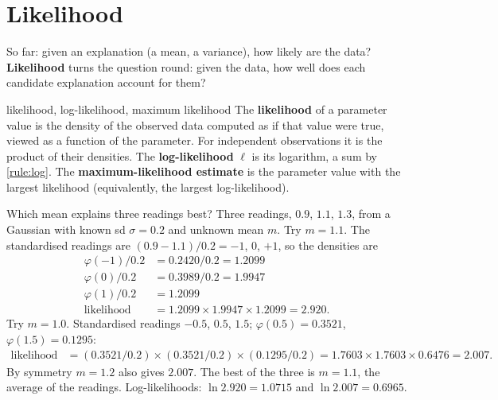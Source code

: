 \documentclass[11pt,a4paper,oneside,openany]{book}
\begin{document}
\section{Likelihood}

So far: given an explanation (a mean, a variance), how likely are the data? \textbf{Likelihood} turns the question round: given
the data, how well does each candidate explanation account for them?

\begin{defn}{likelihood, log-likelihood, maximum likelihood}
The \textbf{likelihood} of a parameter value is the density of the observed data computed as if that value were true, viewed
as a function of the parameter. For independent observations it is the product of their densities. The
\textbf{log-likelihood} $\ell$ is its logarithm, a sum by \cref{rule:log}. The \textbf{maximum-likelihood estimate} is the
parameter value with the largest likelihood (equivalently, the largest log-likelihood).
\end{defn}

\begin{worked}[label=we:lik]{Which mean explains three readings best?}
Three readings, $0.9$, $1.1$, $1.3$, from a Gaussian with known sd $\sigma=0.2$ and unknown mean $m$. Try $m=1.1$. The
standardised readings are $(0.9-1.1)/0.2=-1$, $0$, $+1$, so the densities are
\begin{align*}
\varphi(-1)/0.2 &= 0.2420/0.2=1.2099\\
\varphi(0)/0.2 &= 0.3989/0.2=1.9947\\
\varphi(1)/0.2 &= 1.2099\\
\text{likelihood} &= 1.2099\times1.9947\times1.2099=2.920 .
\end{align*}
Try $m=1.0$. Standardised readings $-0.5$, $0.5$, $1.5$; $\varphi(0.5)=0.3521$, $\varphi(1.5)=0.1295$:
\begin{align*}
\text{likelihood} &= (0.3521/0.2)\times(0.3521/0.2)\times(0.1295/0.2)=1.7603\times1.7603\times0.6476=2.007 .
\end{align*}
By symmetry $m=1.2$ also gives $2.007$. The best of the three is $m=1.1$, the average of the readings. Log-likelihoods:
$\ln2.920=1.0715$ and $\ln2.007=0.6965$.
\end{worked}
\end{document}
